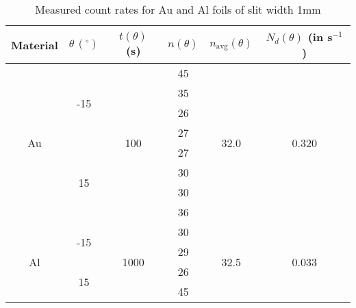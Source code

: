 \begin{table}[]
    \centering
    \begin{tabular}{|c|c|c|c|c|c|}
    \hline
    Material & $\theta\,(^\circ)$ & $t(\theta)$ (s) & $n(\theta)$ & $n_\text{avg}(\theta)$ & $N_d(\theta)$ (in s$^{-1}$) \\ \hline
    \multirow{8}{*}{Au} & \multirow{4}{*}{-15} & \multirow{8}{*}{100} & 45 & \multirow{8}{*}{32.0} & \multirow{8}{*}{0.320} \\ \cline{4-4}
     &  &  & 35 &  &  \\ \cline{4-4}
     &  &  & 26 &  &  \\ \cline{4-4}
     &  &  & 27 &  &  \\ \cline{2-2} \cline{4-4}
     & \multirow{4}{*}{15} &  & 27 &  &  \\ \cline{4-4}
     &  &  & 30 &  &  \\ \cline{4-4}
     &  &  & 30 &  &  \\ \cline{4-4}
     &  &  & 36 &  &  \\ \hline
    \multirow{4}{*}{Al} & \multirow{2}{*}{-15} & \multirow{4}{*}{1000} & 30 & \multirow{4}{*}{32.5} & \multirow{4}{*}{0.033} \\ \cline{4-4}
     &  &  & 29 &  &  \\ \cline{2-2} \cline{4-4}
     & \multirow{2}{*}{15} &  & 26 &  &  \\ \cline{4-4}
     &  &  & 45 &  &  \\ \hline
    \end{tabular}
    \caption{Measured count rates for Au and Al foils of slit width 1mm}
    \label{tab:z}
    \end{table}